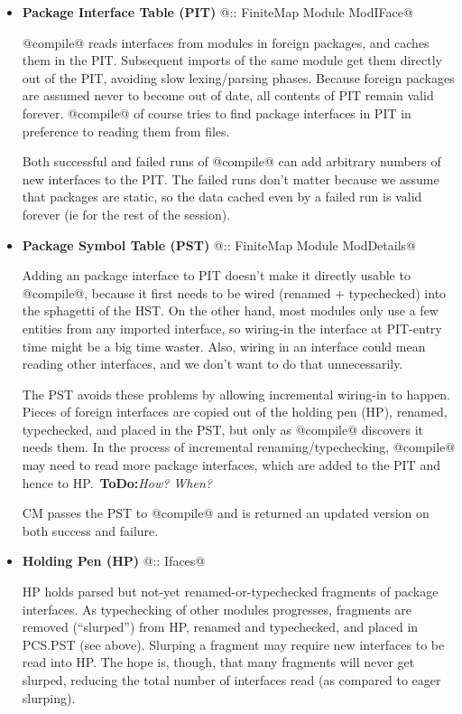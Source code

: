 \documentclass[11pt]{article}
\newcommand{\ToDo}[1]{{{\bf ToDo:}\sl #1}}
\begin{document}
   \begin{itemize}
   \item
      {\bf Package Interface Table (PIT)} @:: FiniteMap Module ModIFace@

   @compile@ reads interfaces from modules in foreign packages, and
   caches them in the PIT.  Subsequent imports of the same module get
   them directly out of the PIT, avoiding slow lexing/parsing phases.
   Because foreign packages are assumed never to become out of date,
   all contents of PIT remain valid forever.  @compile@ of course
   tries to find package interfaces in PIT in preference to reading
   them from files.  

   Both successful and failed runs of @compile@ can add arbitrary
   numbers of new interfaces to the PIT.  The failed runs don't matter
   because we assume that packages are static, so the data cached even
   by a failed run is valid forever (ie for the rest of the session).

   \item
      {\bf Package Symbol Table (PST)} @:: FiniteMap Module ModDetails@

   Adding an package interface to PIT doesn't make it directly usable
   to @compile@, because it first needs to be wired (renamed +
   typechecked) into the sphagetti of the HST.  On the other hand,
   most modules only use a few entities from any imported interface,
   so wiring-in the interface at PIT-entry time might be a big time
   waster.  Also, wiring in an interface could mean reading other
   interfaces, and we don't want to do that unnecessarily.

   The PST avoids these problems by allowing incremental wiring-in to
   happen.  Pieces of foreign interfaces are copied out of the holding
   pen (HP), renamed, typechecked, and placed in the PST, but only as
   @compile@ discovers it needs them.  In the process of incremental
   renaming/typechecking, @compile@ may need to read more package
   interfaces, which are added to the PIT and hence to 
   HP.~\ToDo{How? When?}

   CM passes the PST to @compile@ and is returned an updated version
   on both success and failure.

   \item 
      {\bf Holding Pen (HP)} @:: Ifaces@ 

   HP holds parsed but not-yet renamed-or-typechecked fragments of
   package interfaces.  As typechecking of other modules progresses,
   fragments are removed (``slurped'') from HP, renamed and
   typechecked, and placed in PCS.PST (see above).  Slurping a
   fragment may require new interfaces to be read into HP.  The hope
   is, though, that many fragments will never get slurped, reducing
   the total number of interfaces read (as compared to eager slurping).

   \end{itemize}
\end{document}
